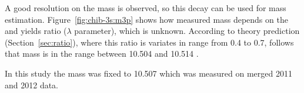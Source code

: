 A good resolution on the \chiboneThreeP mass is observed, so this decay can be
used for \chiboneThreeP mass estimation. Figure~\ref{fig:chib-3s:m3p} shows
how \chiboneThreeP measured mass depends on the \chiboneThreeP and \chibtwoThreeP 
yields ratio ($\lambda$ parameter), which is unknown. 
According to theory prediction (Section~\ref{sec:ratio}), where this ratio is
variates in range from 0.4 to 0.7, follows that \chiboneThreeP mass is in 
the range between 10.504 and 10.514 \gevcc.




In this study the mass was fixed to 10.507 \gevcc which was measured on merged 2011 and 2012 data.






